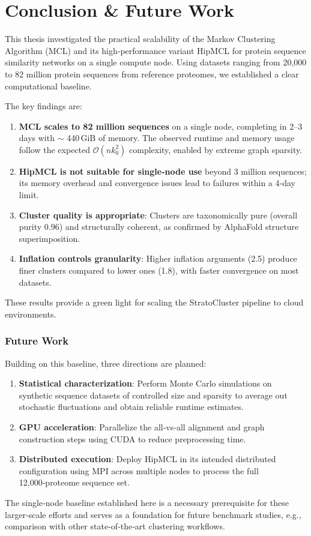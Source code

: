 \section[Conclusion \& \ Future Work]{Conclusion \& Future Work}

This thesis investigated the practical scalability of the Markov Clustering
Algorithm (MCL) and its high‑performance variant HipMCL for protein sequence
similarity networks on a single compute node. Using datasets ranging from
20,000 to 82 million protein sequences from reference proteomes, we established
a clear computational baseline.

The key findings are:

\begin{enumerate}
  \item \textbf{MCL scales to 82 million sequences} on a single node, completing in 2–3 days with \(\sim\) 440 GiB of memory. The observed runtime and memory usage follow the expected \(\mathcal{O}(n k_0^2)\) complexity, enabled by extreme graph sparsity.
  \item \textbf{HipMCL is not suitable for single‑node use} beyond 3 million sequences; its memory overhead and convergence issues lead to failures within a 4‑day limit.
  \item \textbf{Cluster quality is appropriate}: Clusters are taxonomically pure (overall purity 0.96) and structurally coherent, as confirmed by AlphaFold structure superimposition.
  \item \textbf{Inflation controls granularity}: Higher inflation arguments (2.5) produce finer clusters compared to lower ones (1.8), with faster convergence on most datasets.
\end{enumerate}

These results provide a green light for scaling the StratoCluster pipeline to cloud environments.

\subsubsection*{Future Work}

Building on this baseline, three directions are planned:

\begin{enumerate}
  \item \textbf{Statistical characterization}: Perform Monte Carlo simulations on synthetic sequence datasets of controlled size and sparsity to average out stochastic fluctuations and obtain reliable runtime estimates.
  \item \textbf{GPU acceleration}: Parallelize the all‑vs‑all alignment and graph construction steps using CUDA to reduce preprocessing time.
  \item \textbf{Distributed execution}: Deploy HipMCL in its intended distributed configuration using MPI across multiple nodes to process the full 12,000‑proteome sequence set.
\end{enumerate}

The single‑node baseline established here is a necessary prerequisite for these
larger‑scale efforts and serves as a foundation for future benchmark studies,
e.g., comparison with other state‑of‑the‑art clustering workflows.

